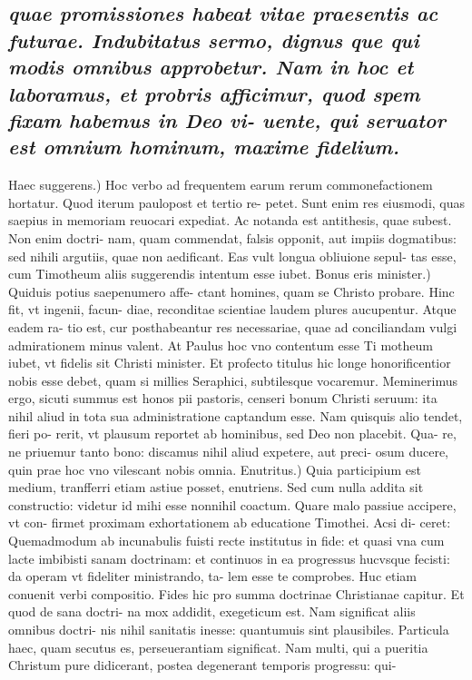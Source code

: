 \documentclass{article}
\begin{document}
\begin{pages}
\subsection*{\textit{quae promissiones habeat vitae praesentis ac futurae. Indubitatus sermo, dignus que qui modis omnibus approbetur. Nam in hoc et laboramus, et probris afficimur, quod spem fixam habemus in Deo vi- uente, qui seruator est omnium hominum, maxime fidelium. }}\pstart Haec suggerens.) Hoc verbo ad frequentem earum rerum commonefactionem hortatur. Quod iterum paulopost et tertio re- petet. Sunt enim res eiusmodi, quas saepius in memoriam reuocari expediat. Ac notanda est antithesis, quae subest. Non enim doctri- nam, quam commendat, falsis opponit, aut impiis dogmatibus: sed nihili argutiis, quae non aedificant. Eas vult longua obliuione sepul- tas esse, cum Timotheum aliis suggerendis intentum esse iubet.  \pend\pstart Bonus eris minister.) Quiduis potius saepenumero affe- ctant homines, quam se Christo probare. Hinc fit, vt ingenii, facun- diae, reconditae scientiae laudem plures aucupentur. Atque eadem ra- tio est, cur posthabeantur res necessariae, quae ad conciliandam vulgi admirationem minus valent. At Paulus hoc vno contentum esse Ti motheum iubet, vt fidelis sit Christi minister. Et profecto titulus hic longe honorificentior nobis esse debet, quam si millies Seraphici, subtilesque vocaremur. Meminerimus ergo, sicuti summus est honos pii pastoris, censeri bonum Christi seruum: ita nihil aliud in tota sua administratione captandum esse. Nam quisquis alio tendet, fieri po- rerit, vt plausum reportet ab hominibus, sed Deo non placebit. Qua- re, ne priuemur tanto bono: discamus nihil aliud expetere, aut preci- osum ducere, quin prae hoc vno vilescant nobis omnia.  \pend\pstart Enutritus.) Quia participium est medium, tranfferri etiam astiue posset, enutriens. Sed cum nulla addita sit constructio: videtur id mihi esse nonnihil coactum. Quare malo passiue accipere, vt con- firmet proximam exhortationem ab educatione Timothei. Acsi di- ceret: Quemadmodum ab incunabulis fuisti recte institutus in fide: et quasi vna cum lacte imbibisti sanam doctrinam: et continuos in ea progressus hucvsque fecisti: da operam vt fideliter ministrando, ta- lem esse te comprobes. Huc etiam conuenit verbi compositio. Fides hic pro summa doctrinae Christianae capitur. Et quod de sana doctri- na mox addidit, exegeticum est. Nam significat aliis omnibus doctri- nis nihil sanitatis inesse: quantumuis sint plausibiles. Particula haec, quam secutus es, perseuerantiam significat. Nam multi, qui a pueritia Christum pure didicerant, postea degenerant temporis progressu: qui-  \pend

\end{pages}
\end{document}
